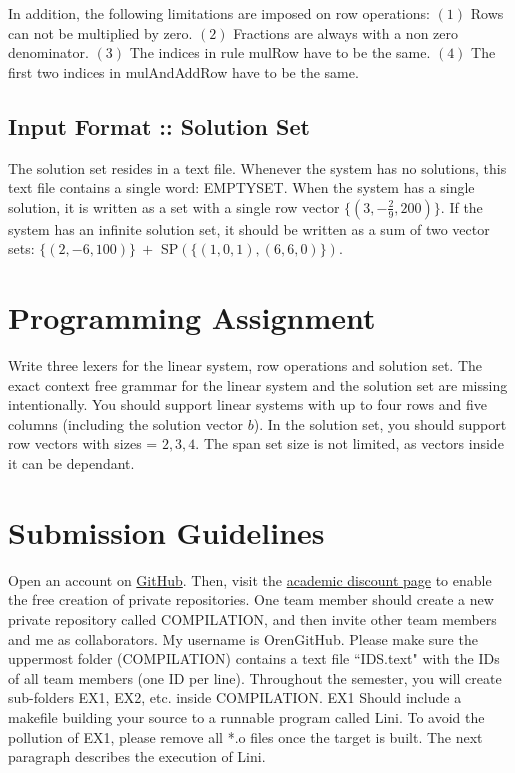 \documentclass{article}
\begin{document}
In addition, the following limitations are imposed on row operations:
$(1)$ Rows can not be multiplied by zero.
$(2)$ Fractions are always with a non zero denominator.
$(3)$ The indices in rule mulRow have to be the same.
$(4)$ The first two indices in mulAndAddRow have to be the same.

\subsection*{Input Format :: Solution Set}
The solution set resides in a text file.
Whenever the system has no solutions, this text file contains a single word:
EMPTYSET. When the system has a single solution, it is written as a set 
with a single row vector $\{(3,-\frac{2}{9},200)\}$. If the system has an infinite
solution set, it should be written as a sum of two vector sets:
$\{(2,-6,100)\} ~ +$ SP$(\{(1,0,1), (6,6,0)\})$.

\section{Programming Assignment}
Write three lexers for the linear system, row operations and solution set.
The exact context free grammar for the linear system and the solution set are missing intentionally.
You should support linear systems with up to four rows and five columns
(including the solution vector $b$).
In the solution set, you should support row vectors with sizes = $2,3,4$.
The span set size is not limited, as vectors inside it can be dependant.

\section{Submission Guidelines}
Open an account on \href{https://github.com/}{GitHub}.
Then, visit the
\href{https://education.github.com/discount_requests/new}{academic discount page}
to enable the free creation of private repositories.
One team member should create a new private repository called COMPILATION,
and then invite other team members and me as collaborators.
My username is OrenGitHub.
Please make sure the uppermost folder (COMPILATION) contains a text file ``IDS.text" with the IDs of all team members (one ID per line).
Throughout the semester, you will create sub-folders EX1, EX2, etc. inside COMPILATION.
EX1 Should include a makefile building your source to a runnable program called Lini.
To avoid the pollution of EX1, please remove all *.o files once the target is built.
The next paragraph describes the execution of Lini.
\end{document}
